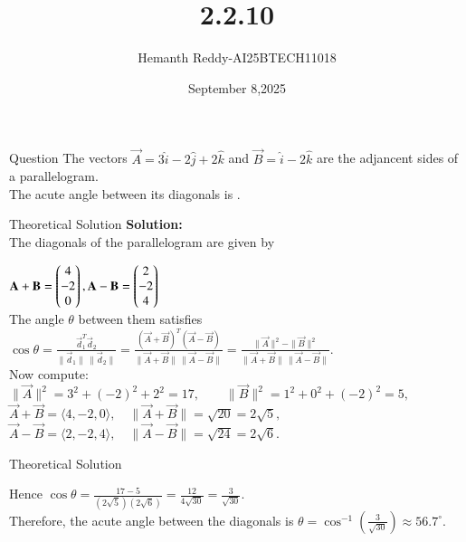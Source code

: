 \documentclass{beamer}
\title %
{2.2.10}
\date{September 8,2025}
\author %
{Hemanth Reddy-AI25BTECH11018}
\begin{document}
\frame{\titlepage}
\begin{frame}{Question}
The vectors $\vec{A} = 3\hat{i} - 2\hat{j} + 2\hat{k}$ and $\vec{B} = \hat{i} - 2\hat{k}$ are the adjancent sides of a parallelogram. \\
The acute angle between its diagonals is \underline{\hspace{2cm}}.
\end{frame}



\begin{frame}{Theoretical Solution}
\textbf{Solution:}\\


The diagonals of the parallelogram are given by\\
\begin{center}
  $  \mathbf{A} + \mathbf{B} =
\begin{pmatrix}
4 \\
-2 \\
0
\end{pmatrix}
, \mathbf{A} - \mathbf{B} =
\begin{pmatrix}
2 \\
-2 \\
4
\end{pmatrix}
$\\

The angle $\theta$ between them satisfies
$
\cos\theta 
= \frac{\vec{d}_1 ^{T}\vec{d}_2}{\|\vec{d}_1\| \, \|\vec{d}_2\|}
= \frac{(\vec{A}+\vec{B})^{T}(\vec{A}-\vec{B})}{\|\vec{A}+\vec{B}\| \, \|\vec{A}-\vec{B}\|}
= \frac{\|\vec{A}\|^2 - \|\vec{B}\|^2}{\|\vec{A}+\vec{B}\| \, \|\vec{A}-\vec{B}\|}.
$\\
\vspace{0.3cm}
Now compute:
$
\|\vec{A}\|^2 = 3^2 + (-2)^2 + 2^2 = 17,
\qquad
\|\vec{B}\|^2 = 1^2 + 0^2 + (-2)^2 = 5,
$\\
\vspace{0.3cm}
$
\vec{A} + \vec{B} = \langle 4, -2, 0 \rangle, 
\quad \|\vec{A}+\vec{B}\| = \sqrt{20} = 2\sqrt{5},
$\\
\vspace{0.3cm}
$
\vec{A} - \vec{B} = \langle 2, -2, 4 \rangle, 
\quad \|\vec{A}-\vec{B}\| = \sqrt{24} = 2\sqrt{6}.
$


\end{center}
\end{frame}

\begin{frame}{Theoretical Solution}
\begin{center}
  Hence  $
\cos\theta 
= \frac{17 - 5}{(2\sqrt{5})(2\sqrt{6})} 
= \frac{12}{4\sqrt{30}} 
= \frac{3}{\sqrt{30}}.
$\\

\vspace{0.3cm}
Therefore, the acute angle between the diagonals is
$
\theta = \cos^{-1}\!\left(\frac{3}{\sqrt{30}}\right) \approx 56.7^\circ.
$

\end{center}

\end{frame}
\end{document}
